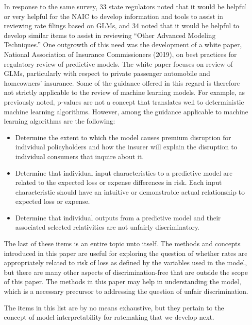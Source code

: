 \documentclass[preprint, 3p, twocolumn, letterpaper, 10pt]{elsarticle} %
\providecommand{\tightlist}{%
  \setlength{\itemsep}{0pt}\setlength{\parskip}{0pt}}
\begin{document}
In response to the same survey, 33 state regulators noted that it would be
helpful or very helpful for the NAIC to develop information and tools to assist
in reviewing rate filings based on GLMs, and 34 noted that it would be helpful
to develop similar items to assist in reviewing ``Other Advanced Modeling
Techniques.'' One outgrowth of this need was the development of a white paper,
National Association of Insurance Commissioners (2019), on best practices for regulatory review of predictive models.
The white paper focuses on review of GLMs, particularly with respect to private
passenger automobile and homeowners' insurance. Some of the guidance offered in
this regard is therefore not strictly applicable to the review of machine
learning models. For example, as previously noted, p-values are not a concept
that translates well to deterministic machine learning algorithms. However,
among the guidance applicable to machine learning algorithms are the following:

\begin{itemize}
\tightlist
\item
  Determine the extent to which the model causes premium disruption for individual
  policyholders and how the insurer will
  explain the disruption to individual consumers that inquire about it.
\item
  Determine that individual input characteristics to a predictive model are
  related to the expected loss or expense
  differences in risk. Each input characteristic should have an intuitive or
  demonstrable actual relationship to expected loss or expense.
\item
  Determine that individual outputs from a predictive model and their associated
  selected relativities are not unfairly discriminatory.
\end{itemize}

The last of these items is an entire topic unto itself. The methods and
concepts introduced in this paper are useful for exploring the question of whether
rates are appropriately related to risk of loss as defined by the variables used
in the model, but there are many other aspects of discrimination-free that are
outside the scope of this paper. The methods in this paper may help in understanding
the model, which is a necessary precursor to addressing the question of unfair
discrimination.

The items in this list are by no means exhaustive, but they pertain to the concept of model
interpretability for ratemaking that we develop next.
\end{document}
